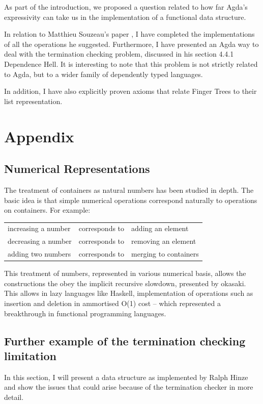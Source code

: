 \documentclass[12pt,twoside,notitlepage]{report}
\begin{document}
As part of the introduction, we proposed a question related to how far Agda's expressivity can take us in the implementation of a functional data structure.

In relation to Matthieu Souzeau's paper \cite{coq}, I have completed the implementations of all the operations he suggested. Furthermore, I have presented an Agda way to deal with the termination checking problem, discussed in his section 4.4.1 Dependence Hell. 
It is interesting to note that this problem is not strictly related to Agda, but to a wider family of dependently typed languages. 

In addition, I have also explicitly proven axioms that relate Finger Trees to their list representation.





\chapter*{Appendix}

\section{Numerical Representations}
\label{app:numrep}
The treatment of containers as natural numbers has been studied in depth\cite{okasaki}. The basic idea is that simple numerical operations correspond naturally to operations on containers. For example:

\vspace{5mm} %
\begin{tabular}{lcl}
increasing a number & corresponds to & adding an element\\
decreasing a number & corresponds to & removing an element \\
adding two numbers & corresponds to & merging to containers \\
\end{tabular} 
\vspace{5mm}

This treatment of numbers, represented in various numerical basis, allows the constructions the obey the implicit recursive slowdown, presented by okasaki. This allows in lazy languages like Haskell, implementation of operations such as insertion and deletion in ammortised O(1) cost -- which represented a breakthrough in functional programming languages.

\section{Further example of the termination checking limitation}
In this section, I will present a data structure as implemented by Ralph Hinze\cite{numerical} and show the issues that could arise because of the termination checker in more detail. 
\end{document}
